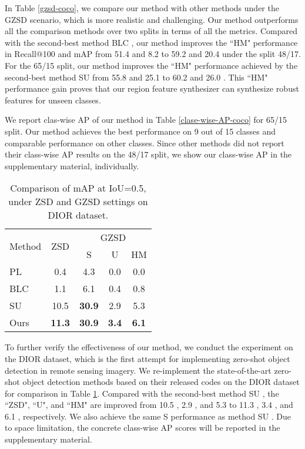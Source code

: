 \documentclass[10pt,twocolumn,letterpaper]{article}
\begin{document}
In Table \ref{gzsd-coco}, we compare our method with other methods under the GZSD scenario, which is more realistic and challenging. Our method outperforms all the comparison methods over two splits in terms of all the metrics.  Compared with the second-best method BLC \cite{zheng2020background}, our method improves the ``HM" performance in Recall@100 and mAP from 51.4  and 8.2  to 59.2  and 20.4  under the split 48/17. For the 65/15 split, our method improves the ``HM" performance achieved by the second-best method SU \cite{hayat2020synthesizing} from 55.8  and 25.1  to 60.2  and 26.0 . This ``HM" performance gain proves that our region feature synthesizer can synthesize robust features for unseen classes.

We report clas-wise AP of our method in Table \ref{clase-wise-AP-coco} for 65/15 split. Our method achieves the best performance on 9 out of 15 classes and comparable performance on other classes. Since other methods did not report their class-wise AP results on the 48/17 split, we show our class-wise AP in the supplementary material, individually.

\begin{table}[t]
  \centering

  \caption{Comparison of mAP at IoU=0.5, under ZSD and GZSD settings on DIOR dataset.}
\renewcommand\tabcolsep{9.0pt}
    \begin{tabular}{lcccc}
    \toprule
    \multirow{2}[4]{*}{Method} & \multirow{2}[4]{*}{ZSD} & \multicolumn{3}{c}{GZSD} \\
\cmidrule{3-5}          &       & S     & U     & HM \\
    \midrule
    PL \cite{rahman2020improved}   & 0.4   & 4.3   & 0.0     & 0.0 \\
    BLC \cite{zheng2020background}  & 1.1   & 6.1   & 0.4   & 0.8 \\
    SU \cite{hayat2020synthesizing}   & 10.5  & \textbf{30.9}  & 2.9   & 5.3 \\
    Ours  & \textbf{11.3}  & \textbf{30.9}  & \textbf{3.4}   & \textbf{6.1} \\
    \bottomrule
    \end{tabular}\label{tab-dior}\end{table}To further verify the effectiveness of our method, we conduct the experiment on the DIOR dataset, which is the first attempt for implementing zero-shot object detection in remote sensing imagery. We re-implement the
state-of-the-art zero-shot object detection methods based on their released codes on the DIOR dataset for comparison in Table \ref{tab-dior}. Compared with the second-best method SU \cite{hayat2020synthesizing}, the ``ZSD", ``U", and ``HM" are improved from 10.5 , 2.9 , and 5.3  to 11.3 , 3.4 , and 6.1 , respectively. We also achieve the same S performance as method SU \cite{hayat2020synthesizing}. Due to space limitation, the concrete class-wise AP scores will be reported in the supplementary material.
\end{document}
